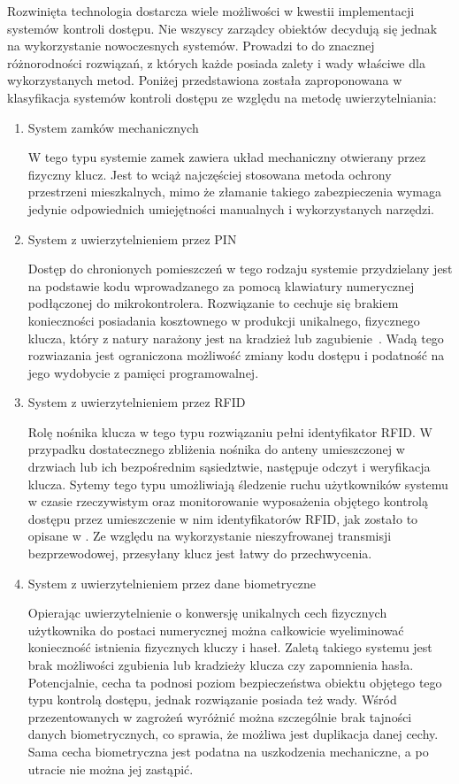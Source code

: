 		Rozwinięta technologia dostarcza wiele możliwości w kwestii implementacji systemów kontroli dostępu. Nie wszyscy zarządcy obiektów decydują się jednak na wykorzystanie nowoczesnych systemów. Prowadzi to do znacznej różnorodności rozwiązań, z których każde posiada zalety i wady właściwe dla wykorzystanych metod. Poniżej przedstawiona została zaproponowana w \cite{access-system-survey} klasyfikacja systemów kontroli dostępu ze względu na metodę uwierzytelniania:
		\begin{enumerate}[label=\Alph*.]
			\item System zamków mechanicznych

				W tego typu systemie zamek zawiera układ mechaniczny otwierany przez fizyczny klucz. Jest to wciąż najczęściej stosowana metoda ochrony przestrzeni mieszkalnych, mimo że złamanie takiego zabezpieczenia wymaga jedynie odpowiednich umiejętności manualnych i wykorzystanych narzędzi.

			\item System z uwierzytelnieniem przez PIN

				Dostęp do chronionych pomieszczeń w tego rodzaju systemie przydzielany jest na podstawie kodu wprowadzanego za pomocą klawiatury numerycznej podłączonej do mikrokontrolera. Rozwiązanie to cechuje się brakiem konieczności posiadania kosztownego w produkcji unikalnego, fizycznego klucza, który z natury narażony jest na kradzież lub zagubienie~\cite{keypad-access-system}. Wadą tego rozwiazania jest ograniczona możliwość zmiany kodu dostępu i podatność na jego wydobycie z pamięci programowalnej.

			\item System z uwierzytelnieniem przez RFID

				Rolę nośnika klucza w tego typu rozwiązaniu pełni identyfikator RFID. W przypadku dostatecznego zbliżenia nośnika do anteny umieszczonej w drzwiach lub ich bezpośrednim sąsiedztwie, następuje odczyt i weryfikacja klucza. Sytemy tego typu umożliwiają śledzenie ruchu użytkowników systemu w czasie rzeczywistym oraz monitorowanie wyposażenia objętego kontrolą dostępu przez umieszczenie w nim identyfikatorów RFID, jak zostało to opisane w \cite{rfid-access-system-for-university}. Ze względu na wykorzystanie nieszyfrowanej transmisji bezprzewodowej, przesyłany klucz jest łatwy do przechwycenia.

			\item System z uwierzytelnieniem przez dane biometryczne

				Opierając uwierzytelnienie o konwersję unikalnych cech fizycznych użytkownika do postaci numerycznej można całkowicie wyeliminować konieczność istnienia fizycznych kluczy i haseł. Zaletą takiego systemu jest brak możliwości zgubienia lub kradzieży klucza czy zapomnienia hasła. Potencjalnie, cecha ta podnosi poziom bezpieczeństwa obiektu objętego tego typu kontrolą dostępu, jednak rozwiązanie posiada też wady. Wśród przezentowanych w \cite{biometric-system-vulnerabilities} zagrożeń wyróżnić można szczególnie brak tajności danych biometrycznych, co sprawia, że możliwa jest duplikacja danej cechy. Sama cecha biometryczna jest podatna na uszkodzenia mechaniczne, a po utracie nie można jej zastąpić.


\end{enumerate}
